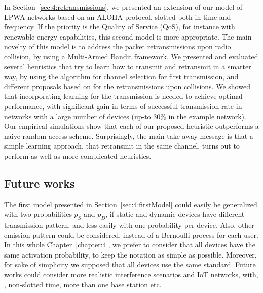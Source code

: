 In Section~\ref{sec:4:retransmissions}, we presented an extension of our model of LPWA networks based on an ALOHA protocol, slotted both in time and frequency.
If the priority is the Quality of Service (QoS), for instance with renewable energy capabilities, this second model is more appropriate.
The main novelty of this model is to address the packet retransmissions upon radio collision, by using a Multi-Armed Bandit framework.
We presented and evaluated several heuristics that try to learn how to transmit and retransmit in a smarter way, by using the \UCB{} algorithm for channel selection for first transmission, and different proposals based on \UCB{} for the retransmissions upon collisions.
%
We showed that incorporating learning for the transmission is needed to achieve optimal performance, with significant gain in terms of successful transmission rate in networks with a large number of devices (up-to $30\%$ in the example network).
Our empirical simulations show that each of our proposed heuristic outperforms a naive random access scheme.
Surprisingly, the main take-away message is that a simple \UCB{} learning approach, that retransmit in the same channel, turns out to perform as well as more complicated heuristics.


\subsection*{Future works}
\label{sub:4:futureWorks}




The first model presented in Section~\ref{sec:4:firstModel} could easily be generalized with two probabilities $p_S$ and $p_D$, if static and dynamic devices have different transmission pattern, and less easily with one probability per device. Also, other emission pattern could be considered, instead of a Bernoulli process for each user.
In this whole Chapter~\ref{chapter:4}, we prefer to consider that all devices have the same activation probability, to keep the notation as simple as possible.
%
Moreover, for sake of simplicity we supposed that all devices use the same standard.
Future works could consider more realistic interference scenarios and IoT networks, with, \eg, non-slotted time, more than one base station etc.

